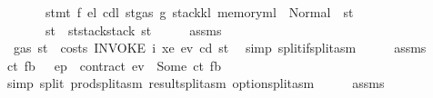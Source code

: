 \begin{isabellebody}
\ \ \ \ \ \ \ {\isachardoublequoteopen}stmt\ f\ e\isactrlsub l\ cd\isactrlsub l\ {\isacharparenleft}{\kern0pt}st{\isasymlparr}gas{\isacharcolon}{\kern0pt}{\isacharequal}{\kern0pt}\ g{\isacharcomma}{\kern0pt}\ stack{\isacharcolon}{\kern0pt}{\isacharequal}{\kern0pt}k\isactrlsub l{\isacharcomma}{\kern0pt}\ memory{\isacharcolon}{\kern0pt}{\isacharequal}{\kern0pt}m\isactrlsub l{\isasymrparr}{\isacharparenright}{\kern0pt}\ {\isacharequal}{\kern0pt}\ Normal\ {\isacharparenleft}{\kern0pt}{\isacharparenleft}{\kern0pt}{\isacharparenright}{\kern0pt}{\isacharcomma}{\kern0pt}\ st{\isacharprime}{\kern0pt}{\isacharprime}{\kern0pt}{\isacharparenright}{\kern0pt}{\isachardoublequoteclose}\isanewline
\ \ \ \ \ \ \ {\isachardoublequoteopen}st{\isacharprime}{\kern0pt}\ {\isacharequal}{\kern0pt}\ st{\isacharprime}{\kern0pt}{\isacharprime}{\kern0pt}{\isasymlparr}stack{\isacharcolon}{\kern0pt}{\isacharequal}{\kern0pt}stack\ st{\isasymrparr}{\isachardoublequoteclose}\isanewline
%
\isadelimproof
%
\endisadelimproof
%
\isatagproof
{}\isamarkupfalse%
\ {\isacharminus}{\kern0pt}\isanewline
\ \ \isamarkupfalse%
\ assms\ \isamarkupfalse%
\ {}{\isacharcolon}{\kern0pt}\ {\isachardoublequoteopen}gas\ st\ {\isachargreater}{\kern0pt}\ costs\ {\isacharparenleft}{\kern0pt}INVOKE\ i\ xe{\isacharparenright}{\kern0pt}\ ev\ cd\ st{\isachardoublequoteclose}\ \isamarkupfalse%
\ {\isacharparenleft}{\kern0pt}simp\ split{\isacharcolon}{\kern0pt}if{\isacharunderscore}{\kern0pt}split{\isacharunderscore}{\kern0pt}asm{\isacharparenright}{\kern0pt}\isanewline
\ \ \isamarkupfalse%
\ \isamarkupfalse%
\ assms\ {}\ \isamarkupfalse%
\ ct\ fb\ \ {}{\isacharcolon}{\kern0pt}\ {\isachardoublequoteopen}ep\ {\isachardollar}{\kern0pt}{\isachardollar}{\kern0pt}\ {\isacharparenleft}{\kern0pt}contract\ ev{\isacharparenright}{\kern0pt}\ {\isacharequal}{\kern0pt}\ Some\ {\isacharparenleft}{\kern0pt}ct{\isacharcomma}{\kern0pt}\ fb{\isacharparenright}{\kern0pt}{\isachardoublequoteclose}\ \isamarkupfalse%
\ {\isacharparenleft}{\kern0pt}simp\ split{\isacharcolon}{\kern0pt}\ prod{\isachardot}{\kern0pt}split{\isacharunderscore}{\kern0pt}asm\ result{\isachardot}{\kern0pt}split{\isacharunderscore}{\kern0pt}asm\ option{\isachardot}{\kern0pt}split{\isacharunderscore}{\kern0pt}asm{\isacharparenright}{\kern0pt}\isanewline
\ \ \isamarkupfalse%
\ \isamarkupfalse%
\ assms\ {}\ {}\ \isamarkupfalse%

\end{isabellebody}
